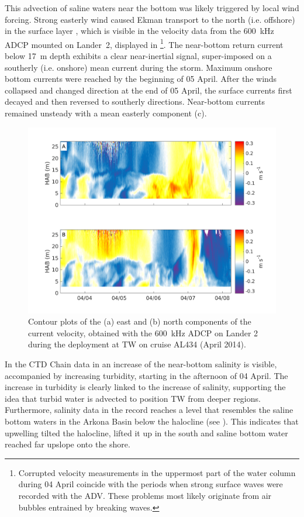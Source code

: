  This advection of saline waters near the bottom was likely triggered by local 
wind 
forcing. Strong easterly wind caused Ekman transport to the north (i.e. 
offshore) in the surface layer \citep[][]{lass2001}, 
which is visible in the 
velocity data from the 600~kHz ADCP mounted on Lander~2, displayed in 
\footnote{Corrupted velocity measurements in the uppermost part of 
the water column during 04 April coincide with the periods when strong surface 
waves were recorded with the ADV. These problems most likely originate from 
air bubbles entrained by breaking waves.}. The near-bottom return current below 
17~m depth exhibits a clear near-inertial signal, super-imposed on a southerly 
(i.e. onshore) mean current during the storm. Maximum onshore bottom currents 
were reached by the beginning of 05 April. After the winds collapsed and 
changed 
direction at the end of 05 April, the surface currents 
first decayed and then reversed to southerly directions. Near-bottom 
currents remained unsteady with a mean easterly component (c).

 \begin{figure}[ht]
\includegraphics[width=40pc]{bilder/adcp600.png}
 \caption{Contour plots of the (a) east and (b) north components of the 
current velocity, obtained with the 600~kHz ADCP on 
Lander 2 during the deployment at TW on cruise AL434 (April 2014).}
 \label{adcp600}
 \end{figure}
\FloatBarrier
 In the CTD Chain data in  an increase of the 
near-bottom salinity is visible, accompanied by increasing turbidity, starting 
in the 
afternoon of 04 April. The increase in turbidity is clearly linked to the 
increase of salinity, supporting the idea that turbid water is advected to 
position TW from deeper 
regions. Furthermore, salinity data in the record reaches a level that 
resembles the saline bottom waters in the Arkona Basin below the 
halocline (see ). This indicates that upwelling 
tilted the halocline, lifted it up in the south and saline bottom water 
reached far upslope onto the shore.

